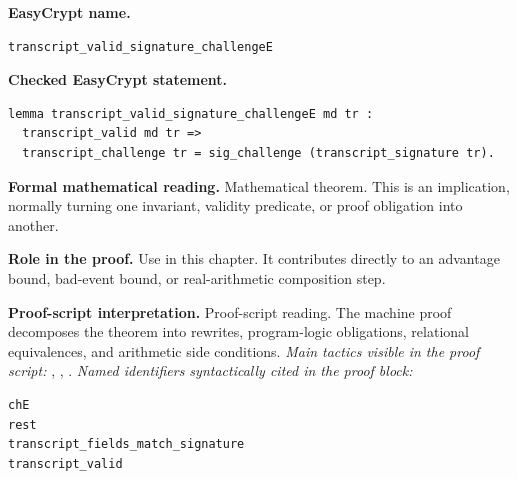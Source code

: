\begin{formaltheorem}
\noindent\textbf{EasyCrypt name.}
\begin{lstlisting}[language=EasyCrypt,basicstyle=\ttfamily\scriptsize]
transcript_valid_signature_challengeE
\end{lstlisting}
\noindent\textbf{Checked EasyCrypt statement.}
\begin{lstlisting}[language=EasyCrypt,basicstyle=\ttfamily\scriptsize]
lemma transcript_valid_signature_challengeE md tr :
  transcript_valid md tr =>
  transcript_challenge tr = sig_challenge (transcript_signature tr).
\end{lstlisting}
\noindent\textbf{Formal mathematical reading.}
Mathematical theorem. This is an implication, normally turning one invariant, validity predicate, or proof obligation into another.

\noindent\textbf{Role in the proof.}
Use in this chapter. It contributes directly to an advantage bound, bad-event bound, or real-arithmetic composition step.

\noindent\textbf{Proof-script interpretation.}
Proof-script reading. The machine proof decomposes the theorem into rewrites, program-logic obligations, relational equivalences, and arithmetic side conditions.
\emph{Main tactics visible in the proof script:} , , .
\emph{Named identifiers syntactically cited in the proof block:}
\begin{lstlisting}[language=EasyCrypt,basicstyle=\ttfamily\scriptsize]
chE
rest
transcript_fields_match_signature
transcript_valid
\end{lstlisting}

\end{formaltheorem}

